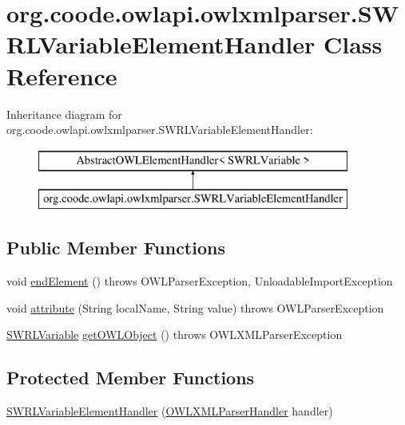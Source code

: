 \hypertarget{classorg_1_1coode_1_1owlapi_1_1owlxmlparser_1_1_s_w_r_l_variable_element_handler}{\section{org.\-coode.\-owlapi.\-owlxmlparser.\-S\-W\-R\-L\-Variable\-Element\-Handler Class Reference}
\label{classorg_1_1coode_1_1owlapi_1_1owlxmlparser_1_1_s_w_r_l_variable_element_handler}
}
Inheritance diagram for org.\-coode.\-owlapi.\-owlxmlparser.\-S\-W\-R\-L\-Variable\-Element\-Handler\-:\begin{figure}[H]
\begin{center}
\leavevmode
\includegraphics[height=2.000000cm]{classorg_1_1coode_1_1owlapi_1_1owlxmlparser_1_1_s_w_r_l_variable_element_handler}
\end{center}
\end{figure}
\subsection*{Public Member Functions}
\begin{DoxyCompactItemize}
\item 
void \hyperlink{classorg_1_1coode_1_1owlapi_1_1owlxmlparser_1_1_s_w_r_l_variable_element_handler_ab12a9986aec7e2a702f8a4e19d5cbf00}{end\-Element} ()  throws O\-W\-L\-Parser\-Exception, Unloadable\-Import\-Exception 
\item 
void \hyperlink{classorg_1_1coode_1_1owlapi_1_1owlxmlparser_1_1_s_w_r_l_variable_element_handler_a10106293a2a20e2ece57c57a0bae592b}{attribute} (String local\-Name, String value)  throws O\-W\-L\-Parser\-Exception 
\item 
\hyperlink{interfaceorg_1_1semanticweb_1_1owlapi_1_1model_1_1_s_w_r_l_variable}{S\-W\-R\-L\-Variable} \hyperlink{classorg_1_1coode_1_1owlapi_1_1owlxmlparser_1_1_s_w_r_l_variable_element_handler_a670a0d571fd1715cabe15b5e9042acc1}{get\-O\-W\-L\-Object} ()  throws O\-W\-L\-X\-M\-L\-Parser\-Exception 
\end{DoxyCompactItemize}
\subsection*{Protected Member Functions}
\begin{DoxyCompactItemize}
\item 
\hyperlink{classorg_1_1coode_1_1owlapi_1_1owlxmlparser_1_1_s_w_r_l_variable_element_handler_a344298cdbfaa9d1b910a788157f24d9f}{S\-W\-R\-L\-Variable\-Element\-Handler} (\hyperlink{classorg_1_1coode_1_1owlapi_1_1owlxmlparser_1_1_o_w_l_x_m_l_parser_handler}{O\-W\-L\-X\-M\-L\-Parser\-Handler} handler)
\end{DoxyCompactItemize}
